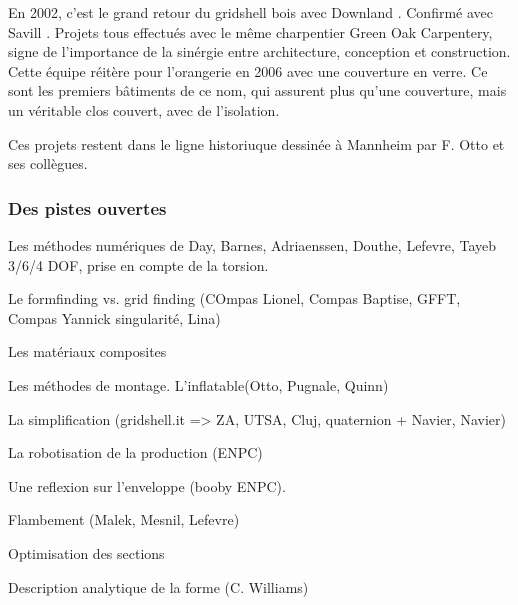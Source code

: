 En 2002, c'est le grand retour du gridshell bois avec Downland \cite{Harris2003}. Confirmé avec Savill \cite{Harris2008}. Projets tous effectués avec le même charpentier Green Oak Carpentery, signe de l'importance de la sinérgie entre architecture, conception et construction. Cette équipe réitère pour l'orangerie en 2006 avec une couverture en verre. Ce sont les premiers bâtiments de ce nom, qui assurent plus qu'une couverture, mais un véritable clos couvert, avec de l'isolation.

Ces projets restent dans le ligne historiuque dessinée à Mannheim par F. Otto et ses collègues.

\subsubsection{Des pistes ouvertes}

Les méthodes numériques de Day, Barnes, Adriaenssen, Douthe, Lefevre, Tayeb
3/6/4 DOF, prise en compte de la torsion.

Le formfinding vs. grid finding (COmpas Lionel, Compas Baptise, GFFT, Compas Yannick singularité, Lina)

Les matériaux composites

Les méthodes de montage. L'inflatable(Otto, Pugnale, Quinn)

La simplification (gridshell.it => ZA, UTSA, Cluj, quaternion + Navier, Navier)

La robotisation de la production (ENPC)

Une reflexion sur l'enveloppe (booby ENPC).

Flambement (Malek, Mesnil, Lefevre)

Optimisation des sections

Description analytique de la forme (C. Williams)









